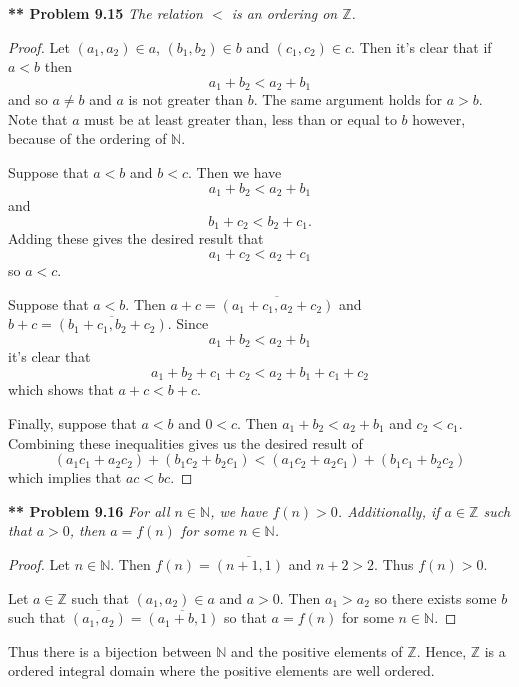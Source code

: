 \documentclass{article}
\begin{document}
\begin{flushleft}
\textbf{** Problem 9.15}
\textit{The relation $<$ is an ordering on $\mathbb{Z}$.}
\begin{proof}
Let $(a_1,a_2) \in a$, $(b_1,b_2) \in b$ and $(c_1,c_2) \in c$. Then it's clear that if $a < b$ then
\[
a_1 + b_2 < a_2 + b_1
\]
and so $a \neq b$ and $a$ is not greater than $b$. The same argument holds for $a > b$. Note that $a$ must be at least greater than, less than or equal to $b$ however, because of the ordering of $\mathbb{N}$.\newline

Suppose that $a < b$ and $b < c$. Then we have
\[
a_1 + b_2 < a_2 + b_1
\]
and
\[
b_1 + c_2 < b_2 + c_1.
\]
Adding these gives the desired result that
\[
a_1 + c_2 < a_2 + c_1
\]
so $a < c$.\newline

Suppose that $a < b$. Then $a + c = \overline{(a_1 + c_1, a_2 + c_2)}$ and $b + c = \overline{(b_1 + c_1, b_2 + c_2)}$. Since
\[
a_1 + b_2 < a_2 + b_1
\]
it's clear that
\[
a_1 + b_2 + c_1 + c_2 < a_2 + b_1 + c_1 + c_2
\]
which shows that $a + c < b + c$.\newline

Finally, suppose that $a < b$ and $0 < c$. Then $a_1 + b_2 < a_2 + b_1$ and $c_2 < c_1$. Combining these inequalities gives us the desired result of
\[
(a_1c_1 + a_2c_2) + (b_1c_2 + b_2c_1) < (a_1c_2 + a_2c_1) + (b_1c_1 + b_2c_2)
\]
which implies that $ac < bc$.
\end{proof}

\textbf{** Problem 9.16}
\textit{For all $n \in \mathbb{N}$, we have $f(n) > 0$. Additionally, if $a \in \mathbb{Z}$ such that $a > 0$, then $a = f(n)$ for some $n \in \mathbb{N}$.}
\begin{proof}
Let $n \in \mathbb{N}$. Then $f(n) = \overline{(n+1, 1)}$ and $n + 2 > 2$. Thus $f(n) > 0$.\newline

Let $a \in \mathbb{Z}$ such that $(a_1, a_2) \in a$ and $a > 0$. Then $a_1 > a_2$ so there exists some $b$ such that $\overline{(a_1, a_2)} = \overline{(a_1 + b, 1)}$ so that $a = f(n)$ for some $n \in \mathbb{N}$.
\end{proof}

Thus there is a bijection between $\mathbb{N}$ and the positive elements of $\mathbb{Z}$. Hence, $\mathbb{Z}$ is a ordered integral domain where the positive elements are well ordered.

\end{flushleft}
\end{document}

